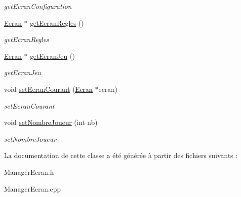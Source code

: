 \begin{DoxyCompactItemize}
\begin{DoxyCompactList}\small\item\em get\-Ecran\-Configuration \end{DoxyCompactList}\item 
\hypertarget{classManagerEcran_a2db0c3682e9a3f2649c9fec608ab6335}{\hyperlink{classEcran}{\-Ecran} $\ast$ \hyperlink{classManagerEcran_a2db0c3682e9a3f2649c9fec608ab6335}{get\-Ecran\-Regles} ()}\label{classManagerEcran_a2db0c3682e9a3f2649c9fec608ab6335}

\begin{DoxyCompactList}\small\item\em get\-Ecran\-Regles \end{DoxyCompactList}\item 
\hypertarget{classManagerEcran_a503972435828a367d34e8fe45a2f6e94}{\hyperlink{classEcran}{\-Ecran} $\ast$ \hyperlink{classManagerEcran_a503972435828a367d34e8fe45a2f6e94}{get\-Ecran\-Jeu} ()}\label{classManagerEcran_a503972435828a367d34e8fe45a2f6e94}

\begin{DoxyCompactList}\small\item\em get\-Ecran\-Jeu \end{DoxyCompactList}\item 
\hypertarget{classManagerEcran_a5cad423b45182e2640e3ef758164ef6b}{void \hyperlink{classManagerEcran_a5cad423b45182e2640e3ef758164ef6b}{set\-Ecran\-Courant} (\hyperlink{classEcran}{\-Ecran} $\ast$ecran)}\label{classManagerEcran_a5cad423b45182e2640e3ef758164ef6b}

\begin{DoxyCompactList}\small\item\em set\-Ecran\-Courant \end{DoxyCompactList}\item 
\hypertarget{classManagerEcran_a5e1c6000fc4baf622b2b460c28986c00}{void \hyperlink{classManagerEcran_a5e1c6000fc4baf622b2b460c28986c00}{set\-Nombre\-Joueur} (int nb)}\label{classManagerEcran_a5e1c6000fc4baf622b2b460c28986c00}

\begin{DoxyCompactList}\small\item\em set\-Nombre\-Joueur \end{DoxyCompactList}\end{DoxyCompactItemize}


\-La documentation de cette classe a été générée à partir des fichiers suivants \-:\begin{DoxyCompactItemize}
\item 
\-Manager\-Ecran.\-h\item 
\-Manager\-Ecran.\-cpp\end{DoxyCompactItemize}
